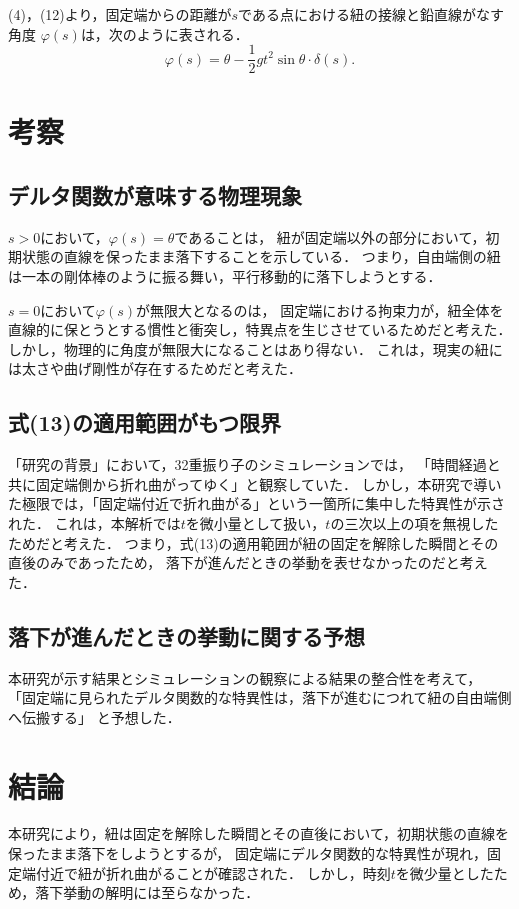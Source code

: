 \documentclass[paper=a4,fontsize=11pt,lualatex]{jlreq}
\begin{document}
(4)，(12)より，固定端からの距離が$s$である点における紐の接線と鉛直線がなす角度
$\varphi \left(s\right)$は，次のように表される．
\begin{equation}
  \varphi\left(s\right) = \theta - \frac{1}{2} g t^2 \sin \theta \cdot \delta \left(s\right).
\end{equation}

\section{考察}
\subsection{デルタ関数が意味する物理現象}
$s > 0$において，$\varphi\left(s\right) = \theta$であることは，
紐が固定端以外の部分において，初期状態の直線を保ったまま落下することを示している．
つまり，自由端側の紐は一本の剛体棒のように振る舞い，平行移動的に落下しようとする．

$s = 0$において$\varphi\left(s\right)$が無限大となるのは，
固定端における拘束力が，紐全体を直線的に保とうとする慣性と衝突し，特異点を生じさせているためだと考えた．
しかし，物理的に角度が無限大になることはあり得ない．
これは，現実の紐には太さや曲げ剛性が存在するためだと考えた．

\subsection{式(13)の適用範囲がもつ限界}
「研究の背景」において，32重振り子のシミュレーションでは，
「時間経過と共に固定端側から折れ曲がってゆく」と観察していた．
しかし，本研究で導いた極限では，「固定端付近で折れ曲がる」という一箇所に集中した特異性が示された．
これは，本解析では$t$を微小量として扱い，$t$の三次以上の項を無視したためだと考えた．
つまり，式(13)の適用範囲が紐の固定を解除した瞬間とその直後のみであったため，
落下が進んだときの挙動を表せなかったのだと考えた．

\subsection{落下が進んだときの挙動に関する予想}
本研究が示す結果とシミュレーションの観察による結果の整合性を考えて，
「固定端に見られたデルタ関数的な特異性は，落下が進むにつれて紐の自由端側へ伝搬する」
と予想した．

\section{結論}
本研究により，紐は固定を解除した瞬間とその直後において，初期状態の直線を保ったまま落下をしようとするが，
固定端にデルタ関数的な特異性が現れ，固定端付近で紐が折れ曲がることが確認された．
しかし，時刻$t$を微少量としたため，落下挙動の解明には至らなかった．
\end{document}
